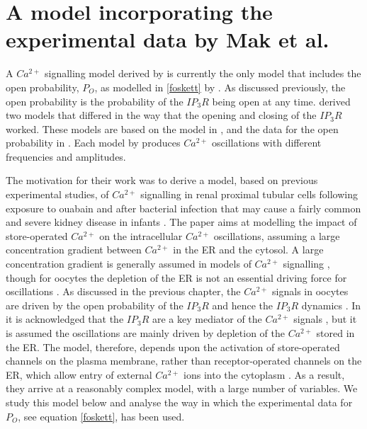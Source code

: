 \chapter{A model incorporating the experimental data by Mak et al.}

A $Ca^{2+}$ signalling model derived by  is currently the only model that includes the open probability, $P_O$,  as modelled in \eqref{foskett} by . As discussed previously, the open probability is the probability of the $IP_3R$ being open at any time.  derived two models that differed in the way that the opening and closing of the $IP_3R$ worked. These models are based on the model in , and the data for the open probability in . Each model by  produces $Ca^{2+}$ oscillations with different frequencies and amplitudes.

The motivation for their work was to derive a model, based on previous experimental studies, of $Ca^{2+}$ signalling in renal proximal tubular cells following exposure to ouabain  and after bacterial infection that may cause a fairly common and severe kidney disease in infants . The paper aims at modelling the impact of store-operated $Ca^{2+}$ on the intracellular $Ca^{2+}$ oscillations, assuming a large concentration gradient between $Ca^{2+}$ in the ER and the cytosol. A large concentration gradient is generally assumed in models of $Ca^{2+}$ signalling \cite{Berridge}, though for oocytes the depletion of the ER is not an essential driving force for oscillations \cite{Sanders2018, wakai}. As discussed in the previous chapter, the $Ca^{2+}$ signals in oocytes are driven by the open probability of the $IP_3R$ and hence the $IP_3R$ dynamics \cite{Mak1998}. In  it is acknowledged that the $IP_3R$ are a key mediator of the $Ca^{2+}$ signals , but it is assumed the oscillations are mainly driven by depletion of the $Ca^{2+}$ stored in the ER. The model, therefore, depends upon the activation of {store-operated channels} on the plasma membrane, rather than receptor-operated channels on the ER, which allow entry of external $Ca^{2+}$ ions into the cytoplasm . As a result, they arrive at a reasonably complex model, with a large number of variables. We study this model below and analyse the way in which the experimental data for $P_O$, see equation \eqref{foskett}, has been used.

